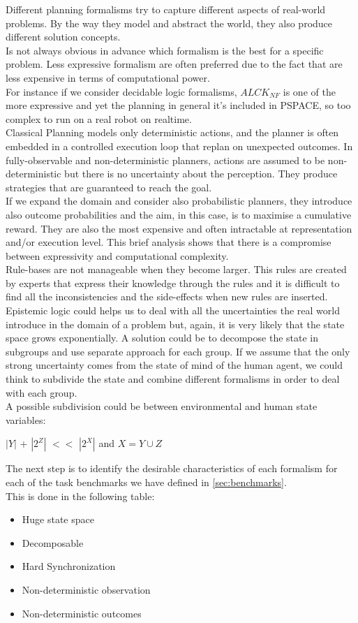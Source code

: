 \documentclass[pdftex,12pt,a4paper]{report}
\begin{document}
\noindent Different planning formalisms try to capture different aspects of real-world problems. By the way they model and abstract the world, they also produce different solution concepts.\\
Is not always obvious in advance which formalism is the best for a specific problem. Less expressive formalism are often preferred due to the fact that are less expensive in terms of computational power.\\
For instance if we consider decidable logic formalisms, $ALCK_{NF}$ is one of the more expressive and yet the planning in general it's included in PSPACE, so too complex to run on a real robot on realtime.\\ 
Classical Planning models only deterministic actions, and the planner is often embedded in a controlled execution loop that replan on unexpected outcomes. In fully-observable and non-deterministic planners, actions are assumed to be non-deterministic but there is no uncertainty about the perception. They produce strategies that are guaranteed to reach the goal. \\
If we expand the domain and consider also probabilistic planners, they introduce also outcome probabilities and the aim, in this case, is to maximise a cumulative reward. They are also the most expensive and often intractable at representation and/or execution level. This brief analysis shows that there is a compromise between expressivity and computational complexity. \\ 
Rule-bases are not manageable when they become larger. This rules are created by experts that express their knowledge through the rules and it is difficult to find all the inconsistencies and the side-effects when new rules are inserted.
Epistemic logic could helps us to deal with all the uncertainties the real world introduce in the domain of a problem but, again, it is very likely that the state space grows exponentially. A solution could be to decompose the state in subgroups and use separate approach for each group.
If we assume that the only strong uncertainty comes from the state of mind of the human agent, we could think to subdivide the state and combine different formalisms in order to deal with each group. \\
A possible subdivision could be between environmental and human state variables: 
\begin{center}
$|Y|$ + $|2^Z|$ $<<$ $|2^X|$ and $X = Y \cup Z$
\end{center}


\noindent The next step is to identify the desirable characteristics of each formalism for each of the task benchmarks we have defined in \ref{sec:benchmarks}. \\
This is done in the following table: 
\begin{itemize}
\item Huge state space
\item Decomposable
\item Hard Synchronization
\item Non-deterministic observation
\item Non-deterministic outcomes
\end{itemize}
  
\end{document}
